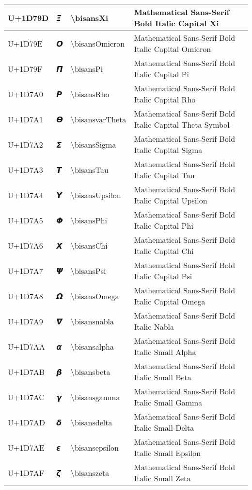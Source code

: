 \begin{table}[h]
\begin{tabulary}{\linewidth}{|L|L|L|L|}
\hline
U+1D79D & 𝞝 & {\textbackslash}bisansXi & Mathematical Sans-Serif Bold Italic Capital Xi \\
\hline
U+1D79E & 𝞞 & {\textbackslash}bisansOmicron & Mathematical Sans-Serif Bold Italic Capital Omicron \\
\hline
U+1D79F & 𝞟 & {\textbackslash}bisansPi & Mathematical Sans-Serif Bold Italic Capital Pi \\
\hline
U+1D7A0 & 𝞠 & {\textbackslash}bisansRho & Mathematical Sans-Serif Bold Italic Capital Rho \\
\hline
U+1D7A1 & 𝞡 & {\textbackslash}bisansvarTheta & Mathematical Sans-Serif Bold Italic Capital Theta Symbol \\
\hline
U+1D7A2 & 𝞢 & {\textbackslash}bisansSigma & Mathematical Sans-Serif Bold Italic Capital Sigma \\
\hline
U+1D7A3 & 𝞣 & {\textbackslash}bisansTau & Mathematical Sans-Serif Bold Italic Capital Tau \\
\hline
U+1D7A4 & 𝞤 & {\textbackslash}bisansUpsilon & Mathematical Sans-Serif Bold Italic Capital Upsilon \\
\hline
U+1D7A5 & 𝞥 & {\textbackslash}bisansPhi & Mathematical Sans-Serif Bold Italic Capital Phi \\
\hline
U+1D7A6 & 𝞦 & {\textbackslash}bisansChi & Mathematical Sans-Serif Bold Italic Capital Chi \\
\hline
U+1D7A7 & 𝞧 & {\textbackslash}bisansPsi & Mathematical Sans-Serif Bold Italic Capital Psi \\
\hline
U+1D7A8 & 𝞨 & {\textbackslash}bisansOmega & Mathematical Sans-Serif Bold Italic Capital Omega \\
\hline
U+1D7A9 & 𝞩 & {\textbackslash}bisansnabla & Mathematical Sans-Serif Bold Italic Nabla \\
\hline
U+1D7AA & 𝞪 & {\textbackslash}bisansalpha & Mathematical Sans-Serif Bold Italic Small Alpha \\
\hline
U+1D7AB & 𝞫 & {\textbackslash}bisansbeta & Mathematical Sans-Serif Bold Italic Small Beta \\
\hline
U+1D7AC & 𝞬 & {\textbackslash}bisansgamma & Mathematical Sans-Serif Bold Italic Small Gamma \\
\hline
U+1D7AD & 𝞭 & {\textbackslash}bisansdelta & Mathematical Sans-Serif Bold Italic Small Delta \\
\hline
U+1D7AE & 𝞮 & {\textbackslash}bisansepsilon & Mathematical Sans-Serif Bold Italic Small Epsilon \\
\hline
U+1D7AF & 𝞯 & {\textbackslash}bisanszeta & Mathematical Sans-Serif Bold Italic Small Zeta \\

\end{tabulary}
\end{table}
